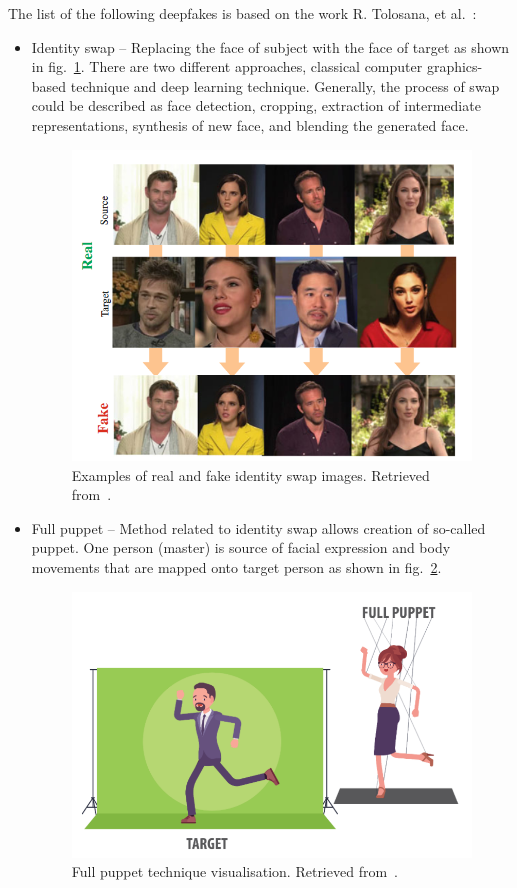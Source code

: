 The list of the following deepfakes is based on the work R. Tolosana, et al.~\cite{IntroductionToDigitalFaceManipulation}:

\begin{itemize}
\item Identity swap – Replacing the face of subject with the face of target as shown in fig.~\ref{fig:idenity_swap}. There are two different approaches, classical computer graphics-based technique and deep learning technique. Generally, the process of swap could be described as face detection, cropping, extraction of intermediate representations, synthesis of new face, and blending the generated face.
\begin{figure}[H]
    \centering
    \includegraphics[width=.53\linewidth]{other-fig/idenity_swap.png}
    \caption{Examples of real and fake identity swap images. Retrieved from~\cite{IntroductionToDigitalFaceManipulation}.}
\label{fig:idenity_swap}
\end{figure}

\item Full puppet – Method related to identity swap allows creation of so-called puppet. One person (master) is source of facial expression and body movements that are mapped onto target person as shown in fig.~\ref{fig:full_puppet}.~\cite{IncreasingThreatofDeepfakeIdentites}
\begin{figure}[H]
    \centering
    \includegraphics[width=.41\linewidth]{other-fig/full_puppet.png}
    \caption{Full puppet technique visualisation. Retrieved from~\cite{TheThreatOfDeepfakes}.}
\label{fig:full_puppet}
\end{figure}


\end{itemize}

